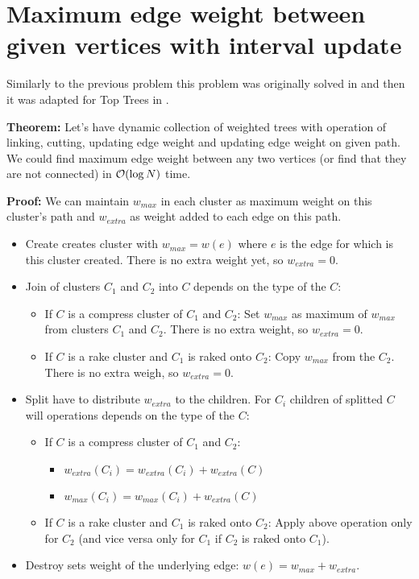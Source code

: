 
\section{Maximum edge weight between given vertices with interval update}

Similarly to the previous problem this problem was originally solved in
\cite{DSforDynamicTrees} and then it was adapted for Top Trees  in
\cite{TopTrees}.

{\bf Theorem:} Let's have dynamic collection of weighted trees with operation of linking,
cutting, updating edge weight and updating edge weight on given path. We could
find maximum edge weight between any two vertices (or find that they are not
connected) in ${\cal O}(\log N)$ time.

\medskip\noindent
{\bf Proof:} We can maintain $w_{max}$ in each cluster as maximum weight on this
cluster's path and $w_{extra}$ as weight added to each edge on this path.

\begin{itemize}

\item {\sc Create} creates cluster with $w_{max}=w(e)$ where $e$ is the edge for
which is this cluster created. There is no extra weight yet, so $w_{extra}=0$.

\item {\sc Join} of clusters $C_1$ and $C_2$ into $C$ depends on the type of the $C$:
	\begin{itemize}
	\item If $C$ is a compress cluster of $C_1$ and $C_2$:
	Set $w_{max}$ as maximum of $w_{max}$ from clusters $C_1$ and $C_2$.
	There is no extra weight, so $w_{extra}=0$.
	\item If $C$ is a rake cluster and $C_1$ is raked onto $C_2$:
	Copy $w_{max}$ from the $C_2$. There is no extra weigh, so $w_{extra}=0$.
	\end{itemize}

\item {\sc Split} have to distribute $w_{extra}$ to the children. For $C_i$ children
of splitted $C$ will operations depends on the type of the $C$:
	\begin{itemize}
	\item If $C$ is a compress cluster of $C_1$ and $C_2$:
		\begin{itemize}[$\circ$]
		\item $w_{extra}(C_i)=w_{extra}(C_i)+w_{extra}(C)$
		\item $w_{max}(C_i)=w_{max}(C_i)+w_{extra}(C)$
		\end{itemize}
	\item If $C$ is a rake cluster and $C_1$ is raked onto $C_2$:
	Apply above operation only for $C_2$ (and vice versa only for $C_1$ if $C_2$
	is raked onto $C_1$).
	\end{itemize}



\item {\sc Destroy} sets weight of the underlying edge: $w(e)=w_{max}+w_{extra}$.

\end{itemize}

